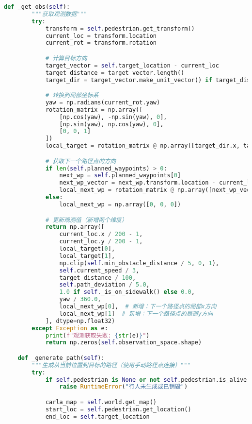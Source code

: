 \begin{lstlisting}[language=Python]
    def _get_obs(self):
        """获取观测数据"""
        try:
            transform = self.pedestrian.get_transform()
            current_loc = transform.location
            current_rot = transform.rotation

            # 计算目标方向
            target_vector = self.target_location - current_loc
            target_distance = target_vector.length()
            target_dir = target_vector.make_unit_vector() if target_distance > 0 else carla.Vector3D()

            # 转换到局部坐标系
            yaw = np.radians(current_rot.yaw)
            rotation_matrix = np.array([
                [np.cos(yaw), -np.sin(yaw), 0],
                [np.sin(yaw), np.cos(yaw), 0],
                [0, 0, 1]
            ])
            local_target = rotation_matrix @ np.array([target_dir.x, target_dir.y, target_dir.z])

            # 获取下一个路径点的方向
            if len(self.planned_waypoints) > 0:
                next_wp = self.planned_waypoints[0]
                next_wp_vector = next_wp.transform.location - current_loc
                local_next_wp = rotation_matrix @ np.array([next_wp_vector.x, next_wp_vector.y, next_wp_vector.z])
            else:
                local_next_wp = np.array([0, 0, 0])

            # 更新观测值（新增两个维度）
            return np.array([
                current_loc.x / 200 - 1,
                current_loc.y / 200 - 1,
                local_target[0],
                local_target[1],
                np.clip(self.min_obstacle_distance / 5, 0, 1),
                self.current_speed / 3,
                target_distance / 100,
                self.path_deviation / 5.0,
                1.0 if self._is_on_sidewalk() else 0.0,
                yaw / 360.0,
                local_next_wp[0],  # 新增：下一个路径点的局部x方向
                local_next_wp[1]  # 新增：下一个路径点的局部y方向
            ], dtype=np.float32)
        except Exception as e:
            print(f"观测获取失败: {str(e)}")
            return np.zeros(self.observation_space.shape)

    def _generate_path(self):
        """生成从当前位置到目标的路径（使用手动路径点连接）"""
        try:
            if self.pedestrian is None or not self.pedestrian.is_alive:
                raise RuntimeError("行人未生成或已销毁")

            carla_map = self.world.get_map()
            start_loc = self.pedestrian.get_location()
            end_loc = self.target_location


\end{lstlisting}
